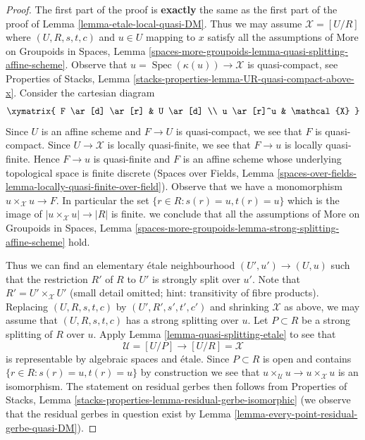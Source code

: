 \documentclass{stacks-project}
\theoremstyle{plain}
\theoremstyle{definition}
\theoremstyle{remark}
\numberwithin{equation}{subsection}
\def\Spec{\mathop{\mathrm{Spec}}}
\begin{document}
\begin{proof}
The first part of the proof is {\bf exactly} the same as the first part
of the proof of Lemma \ref{lemma-etale-local-quasi-DM}.
Thus we may assume $\mathcal{X} = [U/R]$ where $(U, R, s, t, c)$
and $u \in U$ mapping to $x$ satisfy all the assumptions of
More on Groupoids in Spaces, Lemma
\ref{spaces-more-groupoids-lemma-quasi-splitting-affine-scheme}.
Observe that $u = \Spec(\kappa(u)) \to \mathcal{X}$ is quasi-compact, see
Properties of Stacks, Lemma
\ref{stacks-properties-lemma-UR-quasi-compact-above-x}.
Consider the cartesian diagram
$$
\xymatrix{
F \ar[d] \ar[r] & U \ar[d] \\
u \ar[r]^u & \mathcal{X}
}
$$
Since $U$ is an affine scheme and $F \to U$ is quasi-compact,
we see that $F$ is quasi-compact. Since $U \to \mathcal{X}$
is locally quasi-finite, we see that $F \to u$ is
locally quasi-finite. Hence $F \to u$ is quasi-finite
and $F$ is an affine scheme whose underlying topological
space is finite discrete (Spaces over Fields, Lemma
\ref{spaces-over-fields-lemma-locally-quasi-finite-over-field}).
Observe that we have a monomorphism $u \times_\mathcal{X} u \to F$.
In particular the set $\{r \in R : s(r) = u, t(r) = u\}$
which is the image of $|u \times_\mathcal{X} u| \to |R|$
is finite. we conclude that all the assumptions of
More on Groupoids in Spaces, Lemma
\ref{spaces-more-groupoids-lemma-strong-splitting-affine-scheme}
hold.

\medskip\noindent
Thus we can find an elementary \'etale neighbourhood
$(U', u') \to (U, u)$ such that the restriction $R'$ of $R$ to $U'$
is strongly split over $u'$. Note that $R' = U' \times_\mathcal{X} U'$
(small detail omitted; hint: transitivity of fibre products).
Replacing $(U, R, s, t, c)$ by $(U', R', s', t', c')$ and shrinking
$\mathcal{X}$ as above, we may assume that $(U, R, s, t, c)$ has
a strong splitting over $u$. Let $P \subset R$ be a strong splitting
of $R$ over $u$. Apply Lemma \ref{lemma-quasi-splitting-etale} to see that
$$
\mathcal{U} = [U/P] \longrightarrow [U/R] = \mathcal{X}
$$
is representable by algebraic spaces and \'etale. Since $P \subset R$
is open and contains $\{r \in R : s(r) = u, t(r) = u\}$ by construction
we see that
$u \times_\mathcal{U} u \to u \times_\mathcal{X} u$ is an isomorphism.
The statement on residual gerbes then follows from
Properties of Stacks, Lemma
\ref{stacks-properties-lemma-residual-gerbe-isomorphic}
(we observe that the residual gerbes in question exist by
Lemma \ref{lemma-every-point-residual-gerbe-quasi-DM}).
\end{proof}
\end{document}
